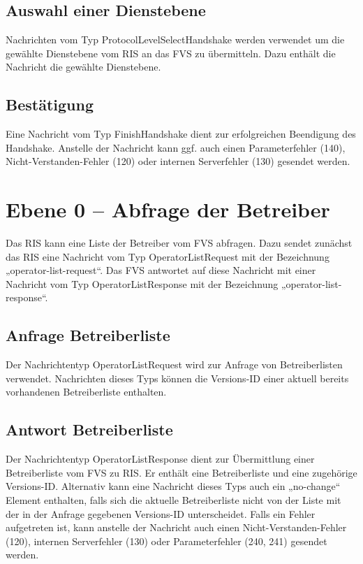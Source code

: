 

\subsection{Auswahl einer Dienstebene}
Nachrichten vom Typ ProtocolLevelSelectHandshake werden verwendet um die gewählte Dienstebene vom RIS an das FVS zu übermitteln. Dazu enthält die Nachricht die gewählte Dienstebene.



\subsection{Bestätigung}
Eine Nachricht vom Typ FinishHandshake dient zur erfolgreichen Beendigung des Handshake. Anstelle der Nachricht kann ggf. auch einen Parameterfehler (140), Nicht-Verstanden-Fehler (120) oder internen Serverfehler (130) gesendet werden. 




\section{Ebene 0 -- Abfrage der Betreiber}
Das RIS kann eine Liste der Betreiber vom FVS abfragen. Dazu sendet zunächst das RIS eine Nachricht vom Typ OperatorListRequest mit der Bezeichnung „operator-list-request“. Das FVS antwortet auf diese Nachricht mit einer Nachricht vom Typ OperatorListResponse mit der Bezeichnung „operator-list-response“.



\subsection{Anfrage Betreiberliste}
Der Nachrichtentyp OperatorListRequest wird zur Anfrage von Betreiberlisten verwendet. Nachrichten dieses Typs können die Versions-ID einer aktuell bereits vorhandenen Betreiberliste enthalten.



\subsection{Antwort Betreiberliste}
Der Nachrichtentyp OperatorListResponse dient zur Übermittlung einer Betreiberliste vom FVS zu RIS. Er enthält eine Betreiberliste und eine zugehörige Versions-ID. Alternativ kann eine Nachricht dieses Typs auch ein „no-change“ Element enthalten, falls sich die aktuelle Betreiberliste nicht von der Liste mit der in der Anfrage gegebenen Versions-ID  unterscheidet. Falls ein Fehler aufgetreten ist, kann anstelle der Nachricht auch einen Nicht-Verstanden-Fehler (120), internen Serverfehler (130) oder Parameterfehler (240, 241) gesendet werden.

